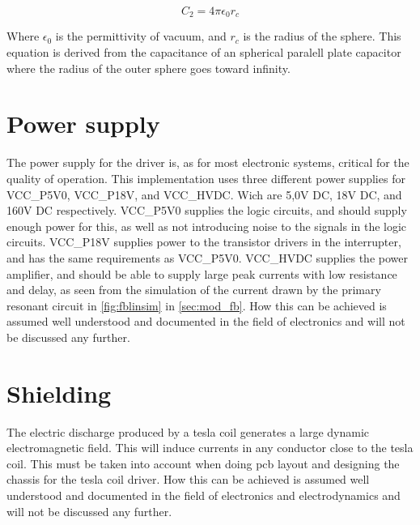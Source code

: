 \begin{equation} \label{eq:c2}
    C_2 = 4 \pi {\epsilon}_0 r_{c}
\end{equation}

Where ${\epsilon}_0$ is the permittivity of vacuum, and $r_c$ is the radius of the sphere. This equation is derived from the capacitance of an spherical paralell plate capacitor where the radius of the outer sphere goes toward infinity.


\section{Power supply}
\label{sec:psu}
The power supply for the driver is, as for most electronic systems, critical for the quality of operation. This implementation uses three different power supplies for VCC\_P5V0, VCC\_P18V, and VCC\_HVDC. Wich are 5,0V DC, 18V DC, and 160V DC respectively. VCC\_P5V0 supplies the logic circuits, and should supply enough power for this, as well as not introducing noise to the signals in the logic circuits. VCC\_P18V supplies power to the transistor drivers in the interrupter, and has the same requirements as VCC\_P5V0. VCC\_HVDC supplies the power amplifier, and should be able to supply large peak currents with low resistance and delay, as seen from the simulation of the current drawn by the primary resonant circuit in \cref{fig:fblinsim} in \cref{sec:mod_fb}. How this can be achieved is assumed well understood and documented in the field of electronics and will not be discussed any further.

\section{Shielding}
\label{sec:shielding}
The electric discharge produced by a tesla coil generates a large dynamic electromagnetic field. This will induce currents in any conductor close to the tesla coil. This must be taken into account when doing pcb layout and designing the chassis for the tesla coil driver. How this can be achieved is assumed well understood and documented in the field of electronics and electrodynamics and will not be discussed any further.

